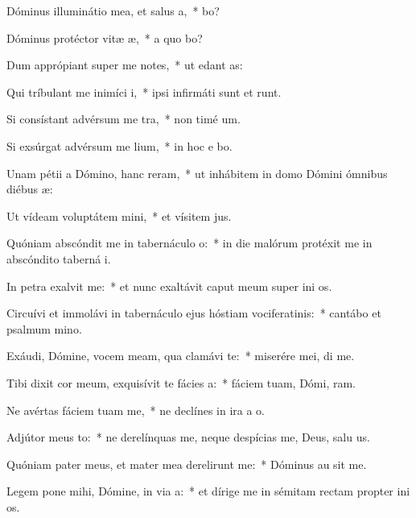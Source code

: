 \item Dóminus illuminátio mea, et salus a,~*  bo?
\item Dóminus protéctor vitæ æ,~* a quo bo?
\item Dum apprópiant super me notes,~* ut edant  as:
\item Qui tríbulant me inimíci i,~* ipsi infirmáti sunt et runt.
\item Si consístant advérsum me tra,~* non timé  um.
\item Si exsúrgat advérsum me lium,~* in hoc e bo.
\item Unam pétii a Dómino, hanc reram,~* ut inhábitem in domo Dómini ómnibus diébus  æ:
\item Ut vídeam voluptátem mini,~* et vísitem  jus.
\item Quóniam abscóndit me in tabernáculo o:~* in die malórum protéxit me in abscóndito taberná i.
\item In petra exalvit me:~* et nunc exaltávit caput meum super ini os.
\item Circuívi et immolávi in tabernáculo ejus hóstiam vociferatinis:~* cantábo et psalmum  mino.
\item Exáudi, Dómine, vocem meam, qua clamávi  te:~* miserére mei,  di me.
\item Tibi dixit cor meum, exquisívit te fácies a:~* fáciem tuam, Dómi, ram.
\item Ne avértas fáciem tuam  me,~* ne declínes in ira a  o.
\item Adjútor meus to:~* ne derelínquas me, neque despícias me, Deus, salu us.
\item Quóniam pater meus, et mater mea derelirunt me:~* Dóminus au sit me.
\item Legem pone mihi, Dómine, in via a:~* et dírige me in sémitam rectam propter ini os.
